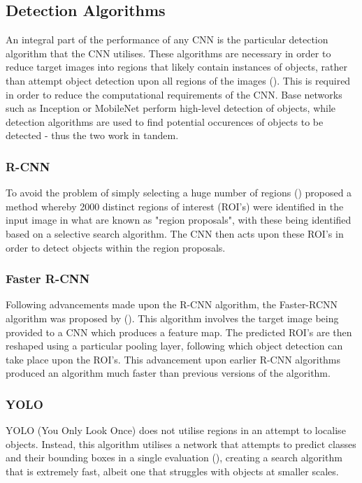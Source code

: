 \documentclass[12pt]{report}
\begin{document}
\subsection{Detection Algorithms}
\begin{flushleft}
An integral part of the performance of any CNN is the particular detection algorithm that the CNN utilises. These algorithms are necessary in order to reduce target images into regions that likely contain instances of objects, rather than attempt object detection upon all regions of the images (\cite{girshick2014rich}). This is required in order to reduce the computational requirements of the CNN. Base networks such as Inception or MobileNet perform high-level detection of objects, while detection algorithms are used to find potential occurences of objects to be detected - thus the two work in tandem. 
\end{flushleft}
\subsubsection*{R-CNN}
\begin{flushleft}
To avoid the problem of simply selecting a huge number of regions (\cite{girshick2014rich}) proposed a method whereby 2000 distinct regions of interest (ROI's) were identified in the input image in what are known as "region proposals", with these being identified based on a selective search algorithm. The CNN then acts upon these ROI's in order to detect objects within the region proposals.
\end{flushleft}

\subsubsection*{Faster R-CNN}
\begin{flushleft}
Following advancements made upon the R-CNN algorithm, the Faster-RCNN algorithm was proposed by (\cite{ren2015faster}). This algorithm involves the target image being provided to a CNN which produces a feature map. The predicted ROI's are then reshaped using a particular pooling layer, following which object detection can take place upon the ROI's. This advancement upon earlier R-CNN algorithms produced an algorithm much faster than previous versions of the algorithm.
\end{flushleft}

\subsubsection*{YOLO}
\begin{flushleft}
YOLO (You Only Look Once) does not utilise regions in an attempt to localise objects. Instead, this algorithm utilises a network that attempts to predict classes and their bounding boxes in a single evaluation (\cite{redmon2016you}), creating a search algorithm that is extremely fast, albeit one that struggles with objects at smaller scales.
\end{flushleft}
\end{document}
